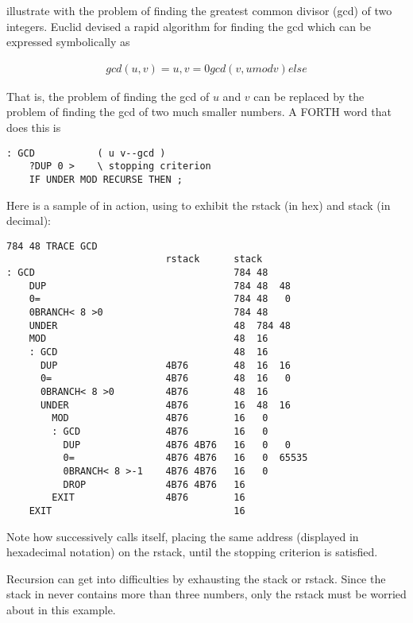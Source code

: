  illustrate with the problem of finding the greatest common divisor (gcd) of two integers. Euclid devised a rapid algorithm for ﬁnding the gcd which can be expressed symbolically as

\begin{align}
    gcd(u,v) = u, v= 0
    gcd(v, u mod v) else
\end{align}
    
That is, the problem of finding the gcd of $u$ and $v$ can be replaced by the problem of finding the gcd of two much smaller numbers. A FORTH word that does this is

\begin{lstlisting}
: GCD           ( u v--gcd )
    ?DUP 0 >    \ stopping criterion
    IF UNDER MOD RECURSE THEN ;
\end{lstlisting}

Here is a sample of  in action, using  to exhibit the rstack (in hex) and stack (in decimal):

\begin{lstlisting}
784 48 TRACE GCD
                            rstack      stack
: GCD                                   784 48
    DUP                                 784 48  48
    0=                                  784 48   0
    0BRANCH< 8 >0                       784 48
    UNDER                               48  784 48
    MOD                                 48  16
    : GCD                               48  16
      DUP                   4B76        48  16  16
      0=                    4B76        48  16   0
      0BRANCH< 8 >0         4B76        48  16
      UNDER                 4B76        16  48  16
        MOD                 4B76        16   0
        : GCD               4B76        16   0
          DUP               4B76 4B76   16   0   0
          0=                4B76 4B76   16   0  65535
          0BRANCH< 8 >-1    4B76 4B76   16   0
          DROP              4B76 4B76   16
        EXIT                4B76        16
    EXIT                                16
\end{lstlisting}

Note how  successively calls itself, placing the same address (displayed in hexadecimal notation) on the rstack, until the stopping criterion is satisfied.

Recursion can get into difficulties by exhausting the stack or rstack. Since the stack in  never contains more than three numbers, only the rstack must be worried about in this example.

